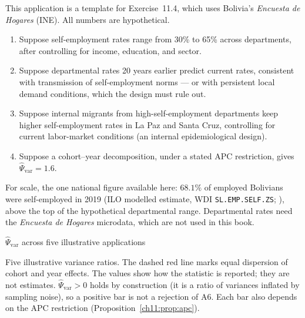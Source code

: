 \documentclass[../structural_economics_book.tex]{subfiles}
\begin{document}
\begin{example}\label{ch11:prop:bolivia}
This application is a template for Exercise~11.4, which uses Bolivia's \textit{Encuesta de Hogares} (INE). All numbers are hypothetical.
\begin{enumerate}
\item Suppose self-employment rates range from 30\% to 65\% across departments, after controlling for income, education, and sector.
\item Suppose departmental rates 20 years earlier predict current rates, consistent with transmission of self-employment norms --- or with persistent local demand conditions, which the design must rule out.
\item Suppose internal migrants from high-self-employment departments keep higher self-employment rates in La Paz and Santa Cruz, controlling for current labor-market conditions (an internal epidemiological design).
\item Suppose a cohort--year decomposition, under a stated APC restriction, gives $\hat{\Psi}_{\text{var}} = 1.6$.
\end{enumerate}
For scale, the one national figure available here: $68.1\%$ of employed Bolivians were self-employed in 2019 (ILO modelled estimate, WDI \texttt{SL.EMP.SELF.ZS}; \citealt{worldbank2026wdi}), above the top of the hypothetical departmental range. Departmental rates need the \textit{Encuesta de Hogares} microdata, which are not used in this book.
\end{example}

\begin{vizpanel}{$\hat{\Psi}_{\text{var}}$ across five illustrative applications}
\begin{center}
\end{center}
\vspace{-0.5em}
\small Five illustrative variance ratios. The dashed red line marks equal dispersion of cohort and year effects. The values show how the statistic is reported; they are not estimates. $\hat{\Psi}_{\text{var}} > 0$ holds by construction (it is a ratio of variances inflated by sampling noise), so a positive bar is not a rejection of A6. Each bar also depends on the APC restriction (Proposition~\ref{ch11:prop:apc}).
\end{vizpanel}
\end{document}

